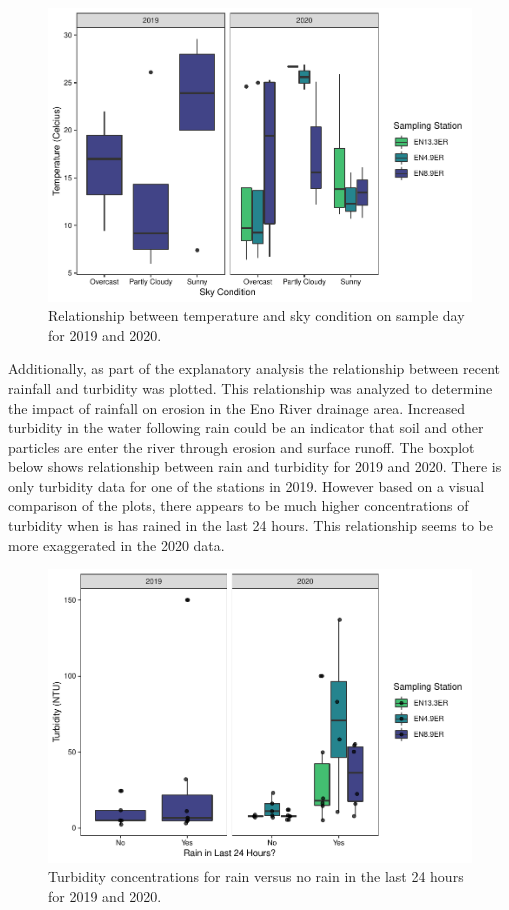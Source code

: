 \documentclass[
  12pt,
]{article}
\begin{document}
\begin{figure}
\centering
\includegraphics{August_Lindborg_ENV872_Project_files/figure-latex/unnamed-chunk-3-1.pdf}
\caption{Relationship between temperature and sky condition on sample
day for 2019 and 2020.}
\end{figure}

Additionally, as part of the explanatory analysis the relationship
between recent rainfall and turbidity was plotted. This relationship was
analyzed to determine the impact of rainfall on erosion in the Eno River
drainage area. Increased turbidity in the water following rain could be
an indicator that soil and other particles are enter the river through
erosion and surface runoff. The boxplot below shows relationship between
rain and turbidity for 2019 and 2020. There is only turbidity data for
one of the stations in 2019. However based on a visual comparison of the
plots, there appears to be much higher concentrations of turbidity when
is has rained in the last 24 hours. This relationship seems to be more
exaggerated in the 2020 data.

\begin{figure}
\centering
\includegraphics{August_Lindborg_ENV872_Project_files/figure-latex/unnamed-chunk-4-1.pdf}
\caption{Turbidity concentrations for rain versus no rain in the last 24
hours for 2019 and 2020.}
\end{figure}
\end{document}
